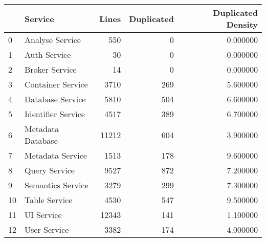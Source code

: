 \begin{tabular}{llrrr}
\toprule
 & Service & Lines & Duplicated & Duplicated Density \\
\midrule
0 & Analyse Service & 550 & 0 & 0.000000 \\
1 & Auth Service & 30 & 0 & 0.000000 \\
2 & Broker Service & 14 & 0 & 0.000000 \\
3 & Container Service & 3710 & 269 & 5.600000 \\
4 & Database Service & 5810 & 504 & 6.600000 \\
5 & Identifier Service & 4517 & 389 & 6.700000 \\
6 & Metadata Database & 11212 & 604 & 3.900000 \\
7 & Metadata Service & 1513 & 178 & 9.600000 \\
8 & Query Service & 9527 & 872 & 7.200000 \\
9 & Semantics Service & 3279 & 299 & 7.300000 \\
10 & Table Service & 4530 & 547 & 9.500000 \\
11 & UI Service & 12343 & 141 & 1.100000 \\
12 & User Service & 3382 & 174 & 4.000000 \\
\bottomrule
\end{tabular}
